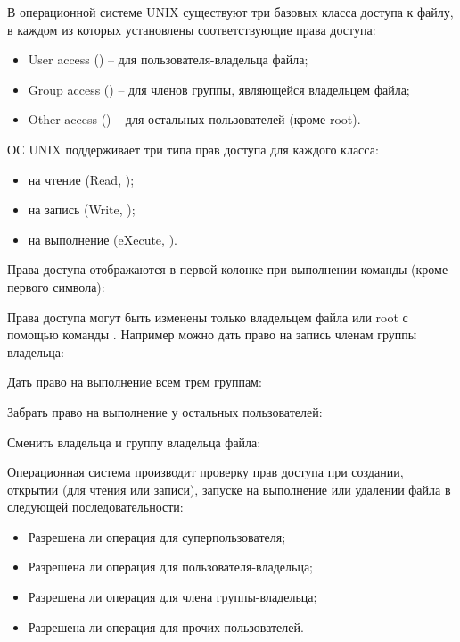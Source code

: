 В операционной системе UNIX существуют три базовых класса доступа к файлу, в каждом из которых установлены соответствующие права доступа:
\begin{itemize}
	\item User access () -- для пользователя-владельца файла;
	\item Group access () -- для членов группы, являющейся владельцем файла;
	\item Other access () -- для остальных пользователей (кроме root).
\end{itemize}

ОС UNIX поддерживает три типа прав доступа для каждого класса: 
\begin{itemize}
	\item на чтение (Read, );
	\item на запись (Write, );
	\item на выполнение (eXecute, ).
\end{itemize}

Права доступа отображаются в первой колонке при выполнении команды  (кроме первого символа):


Права доступа могут быть изменены только владельцем файла или root с помощью команды . Например можно дать право на запись членам группы владельца:


Дать право на выполнение всем трем группам:


Забрать право на выполнение у остальных пользователей:


Сменить владельца и группу владельца файла:


Операционная система производит проверку прав доступа при создании, открытии (для чтения или записи), запуске на выполнение или удалении файла в следующей последовательности:
\begin{itemize}
	\item Разрешена ли операция для суперпользователя;
	\item Разрешена ли операция для пользователя-владельца;
	\item Разрешена ли операция для члена группы-владельца;
	\item Разрешена ли операция для прочих пользователей.
\end{itemize}

